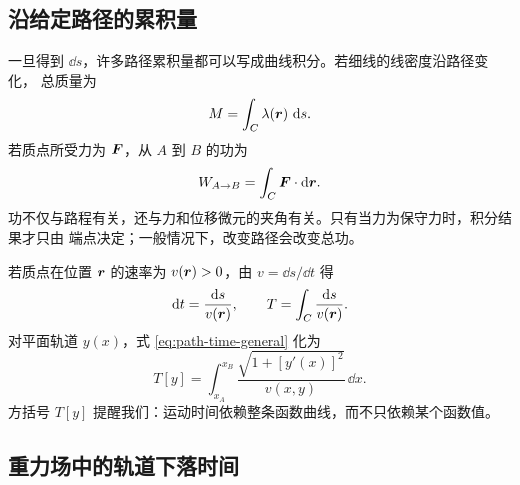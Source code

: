 \documentclass[UTF8,zihao=-4,oneside,openany]{ctexbook}
\begin{document}
\subsection{沿给定路径的累积量}

一旦得到 $\dd s$，许多路径累积量都可以写成曲线积分。若细线的线密度沿路径变化，
总质量为
\[
  M=\int_C\lambda(\bm{r})\,\mathop{}\!\mathrm{d} s.
\]
若质点所受力为 $\bm{F}$，从 $A$ 到 $B$ 的功为
\[
  W_{A\to B}=\int_C\bm{F}\cdot\mathop{}\!\mathrm{d}\bm{r}.
\]
功不仅与路程有关，还与力和位移微元的夹角有关。只有当力为保守力时，积分结果才只由
端点决定；一般情况下，改变路径会改变总功。

若质点在位置 $\bm{r}$ 的速率为 $v(\bm{r})>0$，由 $v=\dd s/\dd t$ 得
\begin{equation}
  \mathop{}\!\mathrm{d} t=\frac{\mathop{}\!\mathrm{d} s}{v(\bm{r})},
  \qquad
  T=\int_C\frac{\mathop{}\!\mathrm{d} s}{v(\bm{r})}.
  \label{eq:path-time-general}
\end{equation}
对平面轨道 $y(x)$，式 \eqref{eq:path-time-general} 化为
\begin{equation}
  T[y]=\int_{x_A}^{x_B}
  \frac{\sqrt{1+[y'(x)]^2}}{v(x,y)}\,\dd x.
  \label{eq:path-time-functional}
\end{equation}
方括号 $T[y]$ 提醒我们：运动时间依赖整条函数曲线，而不只依赖某个函数值。

\subsection{重力场中的轨道下落时间}
\end{document}
